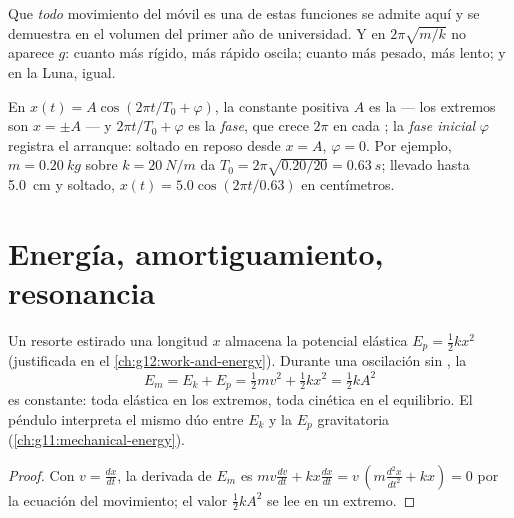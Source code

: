\begin{remark}\label{rem:g12:oscillators-and-time:uniqueness}
Que \emph{todo} movimiento del móvil es una de estas funciones se admite aquí y se
demuestra en el volumen del primer año de universidad. Y en $2\pi\sqrt{m/k}$ no
aparece $g$: cuanto más rígido, más rápido oscila; cuanto más pesado, más lento; y en
la Luna, igual.
\end{remark}

\begin{definition}\label{def:g12:oscillators-and-time:phase}
En $x(t) = A\cos(2\pi t/T_0 + \varphi)$, la constante positiva $A$ es la  ---
los extremos son $x = \pm A$ --- y $2\pi t/T_0 + \varphi$ es la
\emph{fase}, que crece $2\pi$ en cada ; la \emph{fase
inicial} $\varphi$ registra el arranque: soltado en reposo desde
$x = A$, $\varphi = 0$. Por ejemplo, $m = \qty{0.20}{kg}$ sobre $k = \qty{20}{N/m}$ da
$T_0 = 2\pi\sqrt{0.20/20} = \qty{0.63}{s}$; llevado hasta \qty{5.0}{cm} y soltado,
$x(t) = 5.0\cos(2\pi t/0.63)$ en centímetros.
\end{definition}

\section{Energía, amortiguamiento, resonancia}

\begin{proposition}\label{prop:g12:oscillators-and-time:energy}
Un resorte estirado una longitud $x$ almacena la  potencial elástica
$E_p = \tfrac12 kx^2$ (justificada en el \cref{ch:g12:work-and-energy}). Durante una
oscilación sin , la 
\[
E_m = E_k + E_p = \tfrac12 m v^2 + \tfrac12 k x^2 = \tfrac12 k A^2
\]
es constante: toda elástica en los extremos, toda cinética en el equilibrio. El
péndulo interpreta el mismo dúo entre $E_k$ y la $E_p$ gravitatoria
(\cref{ch:g11:mechanical-energy}).
\end{proposition}

\begin{proof}
Con $v = \frac{dx}{dt}$, la derivada de $E_m$ es
$mv\frac{dv}{dt} + kx\frac{dx}{dt} = v\,(m\frac{d^2x}{dt^2} + kx) = 0$ por la ecuación
del movimiento; el valor $\tfrac12 kA^2$ se lee en un extremo.
\end{proof}

